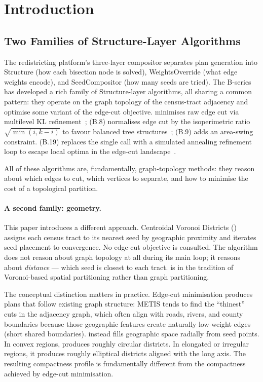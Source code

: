 \section{Introduction}
\label{sec:introduction}

\subsection{Two Families of Structure-Layer Algorithms}

The redistricting platform's three-layer compositor separates plan generation
into Structure (how each bisection node is solved), WeightsOverride (what edge
weights encode), and SeedCompositor (how many seeds are tried).
The B-series has developed a rich family of Structure-layer algorithms,
all sharing a common pattern: they operate on the graph topology of the
census-tract adjacency and optimise some variant of the edge-cut objective.
\metis{} minimises raw edge cut via multilevel KL refinement~\citep{karypis1998};
\geosec{} (B.8) normalises edge cut by the isoperimetric ratio
$\sqrt{\min(i,k-i)}$ to favour balanced tree structures~\citep{b8paper};
\areasec{} (B.9) adds an area-swing constraint.
\sa{} (B.19) replaces the single \metis{} call with a simulated annealing
refinement loop to escape local optima in the edge-cut landscape~\citep{b19paper}.

All of these algorithms are, fundamentally, graph-topology methods: they
reason about which edges to cut, which vertices to separate, and how to
minimise the cost of a topological partition.

\paragraph{A second family: geometry.}
This paper introduces a different approach.
Centroidal Voronoi Districts (\cvd{}) assigns each census tract to its nearest
seed by geographic proximity and iterates seed placement to convergence.
No edge-cut objective is consulted.
The algorithm does not reason about graph topology at all during its main loop;
it reasons about \emph{distance} --- which seed is closest to each tract.
\cvd{} is in the tradition of Voronoi-based spatial partitioning rather than
graph partitioning.

The conceptual distinction matters in practice.
Edge-cut minimisation produces plans that follow existing graph structure:
METIS tends to find the ``thinest'' cuts in the adjacency graph, which often
align with roads, rivers, and county boundaries because those geographic
features create naturally low-weight edges (short shared boundaries).
\cvd{} instead fills geographic space radially from seed points.
In convex regions, \cvd{} produces roughly circular districts.
In elongated or irregular regions, it produces roughly elliptical districts
aligned with the long axis.
The resulting compactness profile is fundamentally different from the
compactness achieved by edge-cut minimisation.


